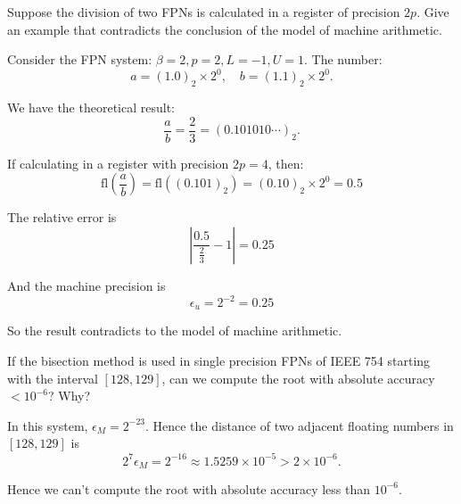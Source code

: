 \documentclass[11pt]{elegantbook}
\begin{document}
\vspace{1em}

\begin{problem}
  Suppose the division of two FPNs is calculated in a register of precision $2p$. Give an example that contradicts the conclusion of the model of machine arithmetic.
\end{problem}

\begin{solution}
  Consider the FPN system: $\beta=2, p=2, L=-1, U=1$. The number:
  \begin{equation*}
    a=(1.0)_2\times 2^{0},\quad b=(1.1)_2\times 2^{0}.
  \end{equation*}

  We have the theoretical result:
  \begin{equation*}
    \frac{a}{b}=\frac{2}{3}=(0.101010\cdots)_2.
  \end{equation*}

  If calculating in a register with precision $2p=4$, then:
  \begin{equation*}
    \text{fl}\left(\frac{a}{b}\right)=\text{fl}((0.101)_2)=(0.10)_2\times 2^{0}=0.5
  \end{equation*}

  The relative error is
  \begin{equation*}
    \left|\frac{0.5}{\frac{2}{3}}-1\right|=0.25
  \end{equation*}

  And the machine precision is
  \begin{equation*}
    \epsilon_u=2^{-2}=0.25
  \end{equation*}

  So the result contradicts to the model of machine arithmetic.

\end{solution}

\begin{problem}
  If the bisection method is used in single precision FPNs of IEEE 754 starting with the interval $[128,129]$, can we compute the root with absolute accuracy $<10^{-6}$? Why?
\end{problem}

\begin{solution}
  In this system, $\epsilon_M=2^{-23}$. Hence the distance of two adjacent floating numbers in $[128,129]$ is
  \begin{equation*}
    2^7\epsilon_M=2^{-16}\approx 1.5259\times 10^{-5}>2\times 10^{-6}.
  \end{equation*}

  Hence we can't compute the root with absolute accuracy less than $10^{-6}$.
\end{solution}
\end{document}
